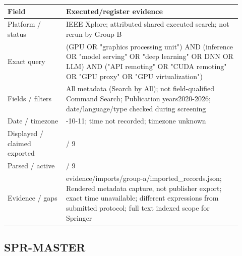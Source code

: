 \documentclass[12pt,a4paper]{article}
\begin{document}
{\small\begin{longtable}{>{\raggedright\arraybackslash}p{0.23\linewidth}>{\raggedright\arraybackslash}p{0.69\linewidth}}
\toprule
Field & Executed/\allowbreak{}register evidence\\\midrule
\endhead
Platform /\allowbreak{} status & IEEE Xplore; attributed shared executed search; not rerun by Group B\\
Exact query & (GPU OR "graphics processing unit") AND (inference OR "model serving" OR "deep learning" OR DNN OR LLM) AND ("API remoting" OR "CUDA remoting" OR "GPU proxy" OR "GPU virtualization")\\
Fields /\allowbreak{} filters & All metadata (Search by All); not field-qualified Command Search; Publication years2020-2026; date/\allowbreak{}language/\allowbreak{}type checked during screening\\
Date /\allowbreak{} timezone & 2026-10-11; time not recorded; timezone unknown\\
Displayed /\allowbreak{} claimed exported & 9 /\allowbreak{} 9\\
Parsed /\allowbreak{} active & 9 /\allowbreak{} 9\\
Evidence /\allowbreak{} gaps & evidence/\allowbreak{}imports/\allowbreak{}group-a/\allowbreak{}imported\_\allowbreak{}records.json; Rendered metadata capture, not publisher export; exact time unavailable; different expressions from submitted protocol; full text indexed scope for Springer\\
\bottomrule
\end{longtable}}

\subsection*{SPR-MASTER}
\end{document}
